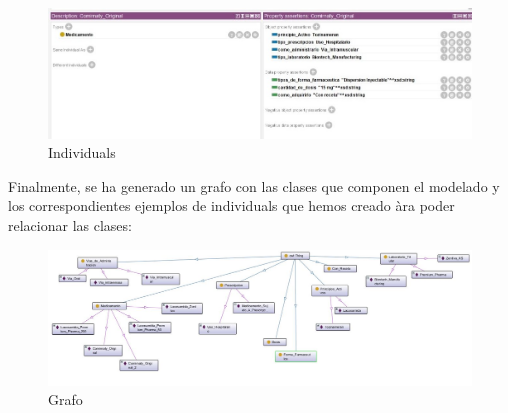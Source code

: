 \documentclass[../main.tex]{subfiles}
\begin{document}
\begin{figure}[h]
    \centering
    \includegraphics[scale=0.5]{images/protege-Individuals-pt2.jpeg}
    \caption{Individuals}
    \label{fig:mesh1}
\end{figure}

\vspace{1cm}
Finalmente, se ha generado un grafo con las clases que componen el modelado y los correspondientes ejemplos de individuals que hemos creado àra poder relacionar las clases: \\

\begin{figure}[h]
    \centering
    \includegraphics[scale=0.4]{images/protege-Grafo.jpeg}   \caption{Grafo}
    \label{fig:mesh1}
\end{figure}
\end{document}
